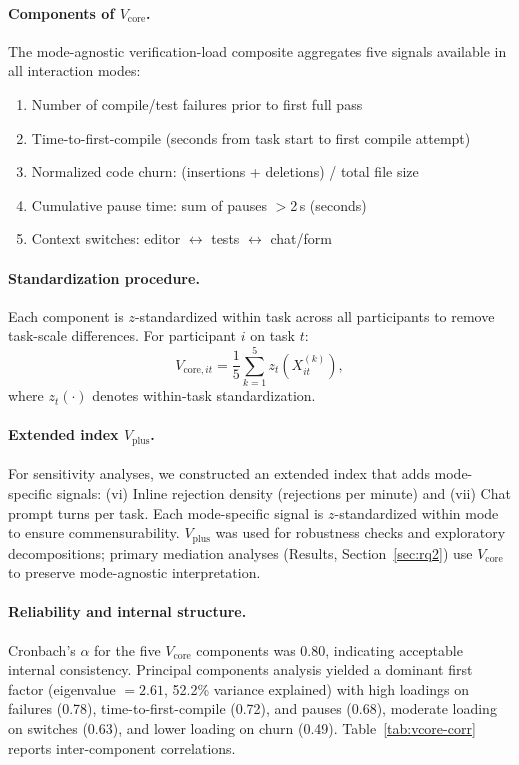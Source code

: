 \documentclass[sigconf]{acmart}
\begin{document}
\paragraph{Components of \(V_{\text{core}}\).}
The mode-agnostic verification-load composite aggregates five signals available in all interaction modes:
\begin{enumerate}[leftmargin=1.5em]
  \item Number of compile/test failures prior to first full pass
  \item Time-to-first-compile (seconds from task start to first compile attempt)
  \item Normalized code churn: (insertions + deletions) / total file size
  \item Cumulative pause time: sum of pauses \(>\)2\,s (seconds)
  \item Context switches: editor \(\leftrightarrow\) tests \(\leftrightarrow\) chat/form
\end{enumerate}

\paragraph{Standardization procedure.}
Each component is \(z\)-standardized within task across all participants to remove task-scale differences. For participant \(i\) on task \(t\):
\[
V_{\text{core},it} = \frac{1}{5}\sum_{k=1}^{5} z_t\!\left(X^{(k)}_{it}\right),
\]
where \(z_t(\cdot)\) denotes within-task standardization.

\paragraph{Extended index \(V_{\text{plus}}\).}
For sensitivity analyses, we constructed an extended index that adds mode-specific signals: (vi) Inline rejection density (rejections per minute) and (vii) Chat prompt turns per task. Each mode-specific signal is \(z\)-standardized within mode to ensure commensurability. \(V_{\text{plus}}\) was used for robustness checks and exploratory decompositions; primary mediation analyses (Results, Section~\ref{sec:rq2}) use \(V_{\text{core}}\) to preserve mode-agnostic interpretation.

\paragraph{Reliability and internal structure.}
Cronbach's \(\alpha\) for the five \(V_{\text{core}}\) components was 0.80, indicating acceptable internal consistency. Principal components analysis yielded a dominant first factor (eigenvalue \(=2.61\), 52.2\% variance explained) with high loadings on failures (0.78), time-to-first-compile (0.72), and pauses (0.68), moderate loading on switches (0.63), and lower loading on churn (0.49). Table~\ref{tab:vcore-corr} reports inter-component correlations.
\end{document}
